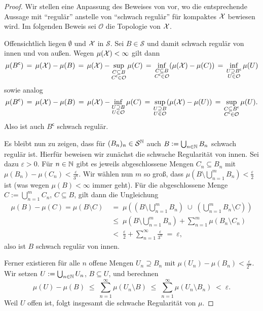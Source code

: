 \documentclass[../thesis/thesis.tex]{subfiles}
\begin{document}
	\begin{proof}
		Wir stellen eine Anpassung des Beweises von 
		\cite[Lemma 4.5.5]{Simon.2015} vor, wo die entsprechende Aussage mit \enquote{regulär} 
		anstelle von \enquote{schwach regulär} für kompaktes $\mathcal{X}$ bewiesen wird. Im folgenden Beweis sei $\mathcal{O}$ die Topologie von $\mathcal{X}$.
		
		Offensichtlich liegen $\emptyset$ und $\mathcal{X}$ in $\mathcal{S}$. Sei 
		$B \in \mathcal{S}$ und damit schwach regulär 
		von innen und von außen. Wegen $\mu(\mathcal{X}) < \infty$ gilt dann
		\[ \mu(B^\mathsf{c}) 
		\, = \, \mu(\mathcal{X}) - \mu(B) 
		\, = \, \mu(\mathcal{X}) - \sup_{\substack{C \subseteq B \\ C^\mathsf{c} \in \mathcal{O}}} \mu(C) 
		\, = \, \inf_{\substack{C \subseteq B \\ C^\mathsf{c} \in \mathcal{O}}} (\mu(\mathcal{X}) - \mu(C))
		\, = \, \inf_{\substack{U \supseteq B^\mathsf{c} \\ U \in \mathcal{O}}} \mu(U) \]
		sowie analog
		\[ \mu(B^\mathsf{c}) 
		\, = \, \mu(\mathcal{X}) - \mu(B) 
		\, = \, \mu(\mathcal{X}) - \inf_{\substack{U \supseteq B \\ U \in \mathcal{O}}} \mu(C)
		\, = \, \sup_{\substack{U \supseteq B \\ U \in \mathcal{O}}} (\mu(\mathcal{X}) - \mu(U))
		\, = \, \sup_{\substack{C \subseteq B^\mathsf{c} \\ C^\mathsf{c} \in 
				\mathcal{O}}} \mu(U) \text{.} \]
		Also ist auch $B^\mathsf{c}$ schwach regulär. 
		
		Es bleibt nun zu zeigen, dass für $(B_n)_n \in \mathcal{S}^{\mathbb{N}}$ auch $B \vcentcolon = 
		\bigcup_{n \in \mathbb{N}} B_n$ schwach regulär ist. 
		Hierfür beweisen wir zunächst die schwache Regularität von innen. 
		Sei dazu $\varepsilon > 0$. Für $n \in \mathbb{N}$ gibt es jeweils abgeschlossene Mengen 
		$C_n \subseteq B_n$ mit $\mu(B_n) - \mu(C_n) < \frac{\varepsilon}{3^n}$.
		Wir wählen nun $m$ so groß, dass $\mu\left( B \setminus \bigcup_{n=1}^m B_n \right) 
		< \frac{\varepsilon}{2}$ ist (was wegen $\mu(B) < \infty$ immer geht). 
		Für die abgeschlossene Menge $C := \bigcup_{n=1}^m C_n$, $C \subseteq B$, gilt dann die Ungleichung 
		\begin{align*}
			\mu(B) - \mu(C) = \mu(B\setminus C) \; &=
			\; \mu\left( \left( B \setminus \bigcup_{n=1}^m B_n \right) \; \cup \; 
			\left( \bigcup_{n=1}^m B_n  \setminus C \right) \right) \\
			&\leq \; \mu \left( B \setminus \bigcup_{n=1}^m B_n \right) + 
			\sum_{n=1}^{m} \mu(B_n \setminus C_n) \\
			&<    \; \frac{\varepsilon}{2} + 
			\sum_{n=1}^{\infty} \frac{\varepsilon}{3^n} \; = \; \varepsilon \text{,}
		\end{align*}
		also ist $B$ schwach regulär von innen.
		
		Ferner existieren für alle $n$ offene Mengen $U_n \supseteq B_n$ 
		mit $\mu(U_n) - \mu(B_n) < \frac{\varepsilon}{2^n}$. Wir setzen 
		$U := \bigcup_{n \in \mathbb{N}} U_n$, $B \subseteq U$, und berechnen  
		$$\mu(U) - \mu(B) \; \leq \; \sum_{n=1}^\infty \mu(U_n \setminus B) \; \leq \; 
		\sum_{n=1}^\infty \mu(U_n \setminus B_n) \; < \; \varepsilon \text{.}$$
		Weil $U$ offen ist, folgt insgesamt die schwache Regularität von $\mu$.
	\end{proof}
	
\end{document}
